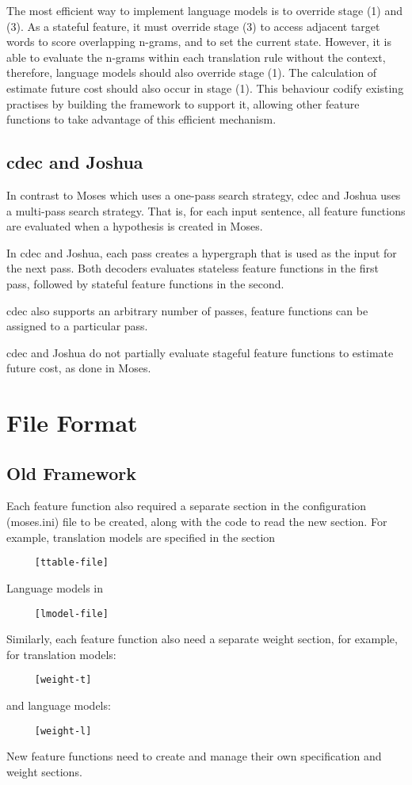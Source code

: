 \documentclass{pbml}
\begin{document}
The most efficient way to implement language models is to override stage (1) and (3). As a stateful feature, it must override stage (3) to access adjacent target words to score overlapping n-grams, and to set the current state. However, it is able to evaluate the n-grams within each translation rule without the context, therefore, language models should also override stage (1). The calculation of estimate future cost should also occur in stage (1). This behaviour codify existing practises by building the framework to support it, allowing other feature functions to take advantage of this efficient mechanism.

\subsection{cdec and Joshua}
In contrast to Moses which uses a one-pass search strategy, cdec and Joshua uses a multi-pass search strategy. That is, for each input sentence, all feature functions are evaluated when a hypothesis is created in Moses.

In cdec and Joshua, each pass creates a hypergraph that is used as the input for the next pass. Both decoders evaluates stateless feature functions in the first pass, followed by stateful feature functions in the second.

cdec also supports an arbitrary number of passes, feature functions can be assigned to a particular pass.

cdec and Joshua do not partially evaluate stageful feature functions to estimate future cost, as done in Moses.

\section{File Format}
\subsection{Old Framework}
Each feature function also required a separate section in the configuration (moses.ini) file to be created, along with the code to read the new section. For example, translation models are specified in the section
\begin{verbatim}
     [ttable-file]
\end{verbatim}
Language models in
\begin{verbatim}
     [lmodel-file]
\end{verbatim}
Similarly, each feature function also need a separate weight section, for example, for translation models:
\begin{verbatim}
     [weight-t]
\end{verbatim}
and language models:
\begin{verbatim}
     [weight-l]
\end{verbatim}
New feature functions need to create and manage their own specification and weight sections.
\end{document}
